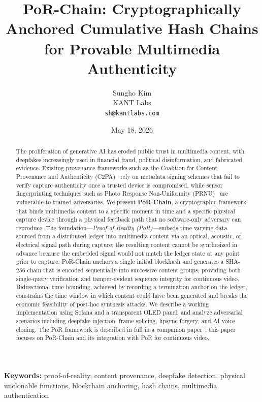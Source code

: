 \documentclass[11pt]{article}
\title{\textbf{PoR-Chain: Cryptographically Anchored Cumulative Hash Chains\\
for Provable Multimedia Authenticity}}
\author{
  Sungho Kim\\
  KANT Labs\\
  \texttt{sh@kantlabs.com}
}
\date{May 18, 2026}
\begin{document}
\maketitle

\begin{abstract}
The proliferation of generative AI has eroded public trust in multimedia content,
with deepfakes increasingly used in financial fraud, political disinformation, and
fabricated evidence. Existing provenance frameworks such as the Coalition for
Content Provenance and Authenticity (C2PA)~\cite{c2pa} rely on metadata signing
schemes that fail to verify capture authenticity once a trusted device is
compromised, while sensor fingerprinting techniques such as Photo Response
Non-Uniformity (PRNU)~\cite{prnu} are vulnerable to trained adversaries. We present \textbf{PoR-Chain}, a cryptographic
framework that binds multimedia content to a specific moment in time and a specific
physical capture device through a physical feedback path that no software-only
adversary can reproduce. The foundation---\emph{Proof-of-Reality (PoR)}---embeds
time-varying data sourced from a distributed ledger into multimedia content via an
optical, acoustic, or electrical signal path during capture; the resulting content
cannot be synthesized in advance because the embedded signal would not match the
ledger state at any point prior to capture. PoR-Chain anchors a single initial blockhash and generates a SHA-256 chain that is
encoded sequentially into successive content groups, providing both single-query
verification and tamper-evident sequence integrity for continuous video. Bidirectional
time bounding, achieved by recording a termination anchor on the ledger, constrains
the time window in which content could have been generated and breaks the economic
feasibility of post-hoc synthesis attacks. We describe a working implementation
using Solana and a transparent OLED panel, and
analyze adversarial scenarios including deepfake injection, frame splicing, lipsync
forgery, and AI voice cloning. The PoR framework is described in full in a companion
paper~\cite{por}; this paper focuses on PoR-Chain and its integration with
PoR for continuous video.
\end{abstract}

\smallskip
\noindent\textbf{Keywords:} proof-of-reality, content provenance, deepfake detection, physical
unclonable functions, blockchain anchoring, hash chains, multimedia authentication


\end{document}

